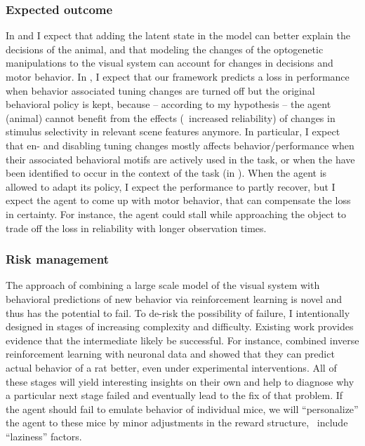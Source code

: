 \documentclass[B2,COG]{ercgrant}
\begin{document}
\subsubsection{Expected outcome} 
In  and  I expect that adding the latent state in the model can better explain the decisions of the animal, and that modeling the changes of the optogenetic manipulations to the visual system can account for changes in decisions and motor behavior. 
In , I expect that our framework predicts a loss in performance when behavior associated tuning changes are turned off but the original behavioral policy is kept, because -- according to my hypothesis -- the agent (animal) cannot benefit from the effects (\ie~increased reliability) of changes in stimulus selectivity in relevant scene features anymore. 
In particular, I expect that en- and disabling tuning changes mostly affects behavior/performance when their associated behavioral motifs are actively used in the task, or when the have been identified to occur in the context of the task (in ).
When the agent is allowed to adapt its policy, I expect the performance to partly recover, but I expect the agent to come up with motor behavior, that can compensate the loss in certainty. 
For instance, the agent could stall while approaching the object to trade off the loss in reliability with longer observation times. 


\subsubsection{Risk management} 
The approach of combining a large scale model of the visual system with behavioral predictions of new behavior via reinforcement learning is novel and thus has the potential to fail. 
To de-risk the possibility of failure, I intentionally designed  in stages of increasing complexity and difficulty. 
Existing work provides evidence that the intermediate likely be successful.  
For instance, \textcite{Kalweit2022-ev} combined inverse reinforcement learning with neuronal data and showed that they can predict actual behavior of a rat better, even under experimental interventions. 
All of these stages will yield interesting insights on their own and help to diagnose why a particular next stage failed and eventually lead to the fix of that problem. If the agent should fail to emulate behavior of individual mice, we will ``personalize'' the agent to these mice by minor adjustments in the reward structure, \eg~include ``laziness'' factors.
\end{document}
